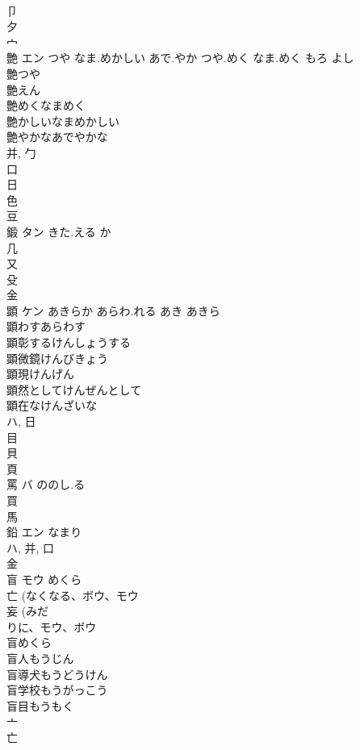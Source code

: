 \documentclass[8pt]{extreport}
\begin{document}
\begin{CJK}{UTF8}{min}
\\	卩 
\\	夕 
\\	宀 
\\	艶	エン	つや なま.めかしい あで.やか つや.めく なま.めく もろ よし	
\\	艶つや
\\	艶えん
\\	艶めくなまめく
\\	艶かしいなまめかしい
\\	艶やかなあでやかな
\\	并, 勹 
\\	口 
\\	日 
\\	色 
\\	豆 
\\	鍛	タン	きた.える か	
\\	几 
\\	又 
\\	殳 
\\	金 
\\	顕	ケン	あきらか あらわ.れる あき あきら	
\\	顕わすあらわす 
\\	顕彰するけんしょうする 
\\	顕微鏡けんびきょう 
\\	顕現けんげん 
\\	顕然としてけんぜんとして 
\\	顕在なけんざいな 
\\	ハ, 日 
\\	目 
\\	貝 
\\	頁 
\\	罵	バ	ののし.る	
\\	買 
\\	馬 
\\	鉛	エン	なまり	
\\	ハ, 并, 口 
\\	金 
\\	盲	モウ	めくら	
\\	亡 (なくなる、ボウ、モウ 
\\	妄 (みだ
\\	りに、モウ、ボウ 
\\	盲めくら 
\\	盲人もうじん 
\\	盲導犬もうどうけん 
\\	盲学校もうがっこう 
\\	盲目もうもく 
\\	亠 
\\	亡 

\end{CJK}
\end{document}
